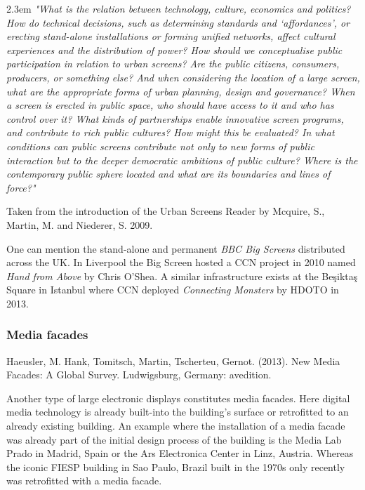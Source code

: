 \begin{singlespace}
	\leftskip2.3em
		\rightskip\leftskip
\textit{\small "What is the relation between technology, culture, economics and politics? How do technical decisions, such as determining standards and ‘affordances’, or erecting stand-alone installations or forming unified networks, affect cultural experiences and the distribution of power? How should we conceptualise public participation in relation to urban screens? Are the public citizens, consumers, producers, or something else? And when considering the location of a large screen, what are the appropriate forms of urban planning, design and governance? When a screen is erected in public space, who should have access to it and who has control over it? What kinds of partnerships enable innovative screen programs, and contribute to rich public cultures? How might this be evaluated? In what conditions can public screens contribute not only to new forms of public interaction but to the deeper democratic ambitions of public culture? Where is the contemporary public sphere located and what are its boundaries and lines of force?"} 

\small Taken from the introduction of the Urban Screens Reader by Mcquire, S., Martin, M. and Niederer, S. 2009.
\end{singlespace}


One can mention the stand-alone and permanent \textit{BBC Big Screens}  distributed across the UK. In Liverpool the Big Screen hosted a CCN project in 2010 named \textit{Hand from Above}  by Chris O’Shea.
A similar infrastructure exists at the Beşiktaş Square in Istanbul where CCN deployed \textit{Connecting Monsters}  by HDOTO in 2013. 


\subsubsection{Media facades}

Haeusler, M. Hank, Tomitsch, Martin,  Tscherteu, Gernot. (2013). New Media Facades: A Global
Survey. Ludwigsburg, Germany: avedition.

Another type of large electronic displays constitutes media facades. Here digital media technology is already built-into the building’s surface or retrofitted to an already existing building. An example where the installation of a media facade was already part of the initial design process of the building is the Media Lab Prado in Madrid, Spain or the Ars Electronica Center in Linz, Austria. Whereas the iconic FIESP building in Sao Paulo, Brazil built in the 1970s only recently was retrofitted with a media facade.

